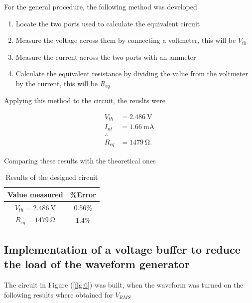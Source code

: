 \documentclass[english,12pt]{article}
\begin{document}
For the general procedure, the following method was developed

\begin{enumerate}
    \item Locate the two ports used to calculate the equivalent circuit
    \item Measure the voltage across them by connecting a voltmeter, this will be $V_{th}$
    \item Measure the current across the two ports with an ammeter
    \item Calculate the equivalent resistance by dividing the value from the voltmeter by the current, this will be $R_{eq}$
\end{enumerate}

Applying this method to the circuit, the reuslts were

\begin{align*}
    V_{th} &= \SI{2.486}{\volt}\\
    I_{nt} &= \SI{1.66}{\milli\ampere}\\
    \therefore\\
    R_{eq} &= \SI{1479}{\ohm}.
\end{align*}

Comparing these results with the theoretical ones

\begin{table}[h]
    \centering
    \begin{tabular}{|c|c|}
    \toprule
         Value measured& \%Error  \\
         \midrule
        $V_{th} = \SI{2.486}{\volt}$ & 0.56\%\\
        $R_{eq} = \SI{1479}{\ohm}$ & 1.4\%\\
        \bottomrule
    \end{tabular}
    \caption{Results of the designed circuit}
    \label{tab:2}
\end{table}

\subsection{Implementation of a voltage buffer to reduce the load of the waveform generator}

The circuit in Figure (\ref{fig:6}) was built, when the waveform was turned on the following results where obtained for $V_{RMS}$
\end{document}

